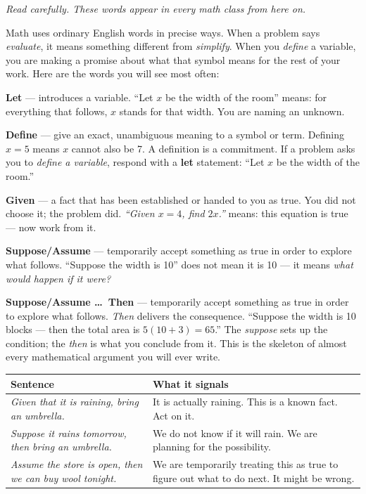 \documentclass[12pt]{article}
\begin{document}
\textit{Read carefully. These words appear in every math class from here on.}

\bigskip
Math uses ordinary English words in precise ways. When a problem says
\textit{evaluate}, it means something different from \textit{simplify}.
When you \textit{define} a variable, you are making a promise about what
that symbol means for the rest of your work. Here are the words you will
see most often:

\bigskip
\noindent\textbf{Let} --- introduces a variable.
``Let $x$ be the width of the room'' means: for everything that follows,
$x$ stands for that width. You are naming an unknown.

\bigskip
\noindent\textbf{Define} --- give an exact, unambiguous meaning to a symbol or term.
Defining $x = 5$ means $x$ cannot also be 7. A definition is a commitment.
If a problem asks you to \textit{define a variable}, respond with a
\textbf{let} statement: ``Let $x$ be the width of the room.''

\bigskip
\noindent\textbf{Given} --- a fact that has been established or handed to you as true.
You did not choose it; the problem did.
\textit{``Given $x=4$, find $2x$.''} means: this equation is true --- now work from it.

\bigskip
\noindent\textbf{Suppose/Assume} --- temporarily accept something as true
in order to explore what follows.
``Suppose the width is 10'' does not mean it is 10 --- it means
\textit{what would happen if it were?} 

\noindent\textbf{Suppose/Assume \ldots\ Then} --- temporarily accept something
as true in order to explore what follows. \textit{Then} delivers the consequence.
``Suppose the width is 10 blocks --- then the total area is $5(10+3) = 65$.''
The \textit{suppose} sets up the condition; the \textit{then} is what you conclude from it.
This is the skeleton of almost every mathematical argument you will ever write.

\begin{center}
    \begin{tabular}{@{} p{5cm} p{8cm} @{}}
    \toprule
    \textbf{Sentence} & \textbf{What it signals} \\
    \midrule
    \textit{Given that it is raining, bring an umbrella.}
      & It is actually raining. This is a known fact. Act on it. \\[6pt]
    \textit{Suppose it rains tomorrow, then bring an umbrella.}
      & We do not know if it will rain. We are planning for the possibility. \\[6pt]
    \textit{Assume the store is open, then we can buy wool tonight.}
      & We are temporarily treating this as true to figure out what to do next.
        It might be wrong. \\
    \bottomrule
    \end{tabular}
\end{center}
\end{document}
